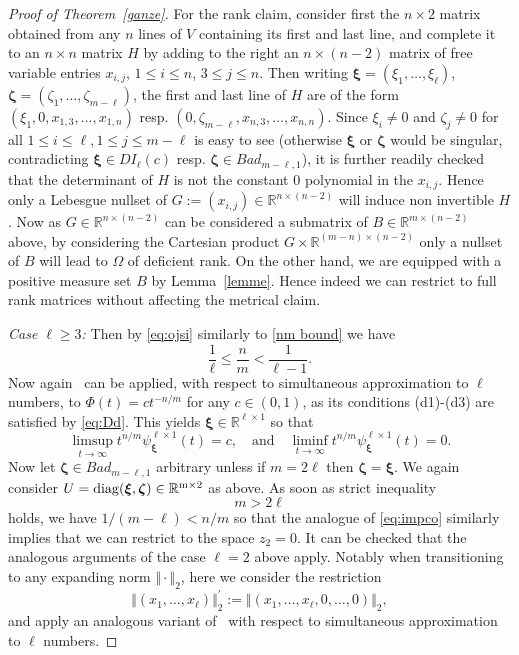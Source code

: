 \documentclass[10pt]{amsart}
\theoremstyle{definition}
\newcommand{\ux}{\boldsymbol{\xi}}
\newcommand{\uz}{\boldsymbol{\zeta}}
\newcommand{\R}{\mathbb{R}}
\begin{document}
\begin{proof}[Proof of Theorem~\ref{ganze}]
    For the rank claim, consider first
    the $n\times 2$ matrix obtained from
    any $n$ lines of $V$ containing its first and last line, and complete it to an $n\times n$ matrix $H$ by 
    adding to the right an $n\times (n-2)$ matrix of free variable entries $x_{i,j}$, $1\le i\le n$, $3\le j\le n$. Then writing
    $\ux=(\xi_1,\ldots,\xi_{\ell})$, $\uz=(\zeta_1,\ldots,\zeta_{m-\ell})$,
    the first and last line of $H$ are of the form
    $(\xi_1, 0, x_{1,3}, \ldots, x_{1,n})$ resp.
    $(0, \zeta_{m-\ell}, x_{n,3}, \ldots, x_{n,n})$. Since $\xi_i\ne 0$ and $\zeta_j\ne 0$ for all $1\le i\le \ell, 1\le j\le m-\ell$
    is easy to see (otherwise $\ux$ or $\uz$ would be singular, contradicting 
    $\ux\in DI_{\ell}(c)$ resp. 
    $\uz\in Bad_{m-\ell,1}$), it is further readily checked
    that the determinant of $H$ is not the constant $0$ polynomial in the
    $x_{i,j}$. Hence only a Lebesgue nullset of $G:=(x_{i,j})\in \R^{n\times (n-2)}$ will induce non invertible $H$. Now as $G\in \R^{n\times (n-2)}$ can be considered a submatrix of $B\in \R^{m\times (n-2)}$ above, by considering the Cartesian product
    $G\times \R^{(m-n)\times (n-2)}$
    only a nullset of $B$ will lead to $\Omega$ of deficient rank. On the other hand, we are equipped with a positive measure set $B$ by Lemma~\ref{lemme}. Hence
    indeed we can restrict to full rank  
    matrices without affecting the metrical claim.


    {\em Case $\ell\ge 3$:}
   Then by \eqref{eq:ojsi} similarly to \eqref{nm bound} we have
    \begin{equation} \label{eq:Dd}
    \frac{1}{\ell}\le \frac{n}{m} < \frac{1}{\ell-1}.
    \end{equation}
    Now again~\cite[Theorem~2.2]{j1} can be applied, with respect to simultaneous approximation to $\ell$ numbers, to $\Phi(t)=ct^{-n/m}$ for
    any $c\in (0,1)$, as its conditions (d1)-(d3) are satisfied by \eqref{eq:Dd}. This yields $\ux\in \R^{\ell \times 1}$ so that
    \[
    \limsup_{t\to\infty} t^{n/m} \psi^{\ell \times 1}_{\ux}(t) = c, \quad \text{and} \quad  \liminf_{t\to\infty} t^{n/m} \psi^{\ell \times 1}_{\ux}(t) = 0.
    \]
    Now let $\uz\in Bad_{m-\ell ,1}$ arbitrary 
    unless if $m=2\ell$ then $\uz=\ux$.
    We again consider $U=\rm{diag}(\ux, \uz)\in \mathbb{R}^{m\times 2}$ as above.
    As soon as strict inequality
    \begin{equation} \label{eq:mpso}
         m> 2\ell
    \end{equation}
    holds, we have $1/(m-\ell)< n/m$ so that
    the analogue of \eqref{eq:impco} similarly implies that we can restrict
    to the space $z_2=0$.
    It can be checked that
    the analogous arguments of the case $\ell=2$ above apply. Notably when 
    transitioning to any expanding norm $\Vert\cdot\Vert_2$, here we consider
    the restriction
    \[
     \Vert (x_1,\ldots,x_{\ell})\Vert_2^{\prime}:= \Vert (x_1,\ldots,x_{\ell},0,\ldots,0)\Vert_2,
    \]
    and apply an analogous variant of~\cite[Corollary~2]{j1} with respect to simultaneous approximation to $\ell$ numbers.
    

\end{proof}
\end{document}
